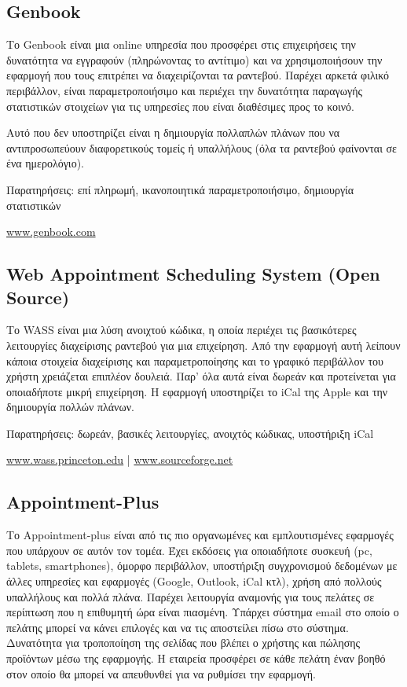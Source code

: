 \subsection{Genbook}
Το Genbook είναι μια online υπηρεσία που προσφέρει στις επιχειρήσεις την δυνατότητα να εγγραφούν (πληρώνοντας το αντίτιμο) και να χρησιμοποιήσουν την εφαρμογή που τους επιτρέπει να διαχειρίζονται τα ραντεβού. Παρέχει αρκετά φιλικό περιβάλλον, είναι παραμετροποιήσιμο και περιέχει την δυνατότητα παραγωγής στατιστικών στοιχείων για τις υπηρεσίες που είναι διαθέσιμες προς το κοινό. 

Αυτό που δεν υποστηρίζει είναι η δημιουργία πολλαπλών πλάνων που να αντιπροσωπεύουν διαφορετικούς τομείς ή υπαλλήλους (όλα τα ραντεβού φαίνονται σε ένα ημερολόγιο).

Παρατηρήσεις: επί πληρωμή, ικανοποιητικά παραμετροποιήσιμο, δημιουργία στατιστικών

\href{http://www.genbook.com}{www.genbook.com}

\subsection{Web Appointment Scheduling System (Open Source)}
Το WASS είναι μια λύση ανοιχτού κώδικα, η οποία περιέχει τις βασικότερες λειτουργίες διαχείρισης ραντεβού για μια επιχείρηση. Από την εφαρμογή αυτή λείπουν κάποια στοιχεία διαχείρισης και παραμετροποίησης και το γραφικό περιβάλλον του χρήστη χρειάζεται επιπλέον δουλειά. Παρ' όλα αυτά είναι δωρεάν και προτείνεται για οποιαδήποτε μικρή επιχείρηση. Η εφαρμογή υποστηρίζει το iCal της Apple και την δημιουργία πολλών πλάνων.

Παρατηρήσεις: δωρεάν, βασικές λειτουργίες, ανοιχτός κώδικας, υποστήριξη iCal

\href{https://wass.princeton.edu/pages/login.page.php}{www.wass.princeton.edu} |
\href{http://sourceforge.net/projects/wass/}{www.sourceforge.net}

\subsection{Appointment-Plus}
Το Appointment-plus είναι από τις πιο οργανωμένες και εμπλουτισμένες εφαρμογές που υπάρχουν σε αυτόν τον τομέα. Έχει εκδόσεις για οποιαδήποτε συσκευή (pc, tablets, smartphones), όμορφο περιβάλλον, υποστήριξη συγχρονισμού δεδομένων με άλλες υπηρεσίες και εφαρμογές (Google, Outlook, iCal κτλ), χρήση από πολλούς υπαλλήλους και πολλά πλάνα. Παρέχει λειτουργία αναμονής για τους πελάτες σε περίπτωση που η επιθυμητή ώρα είναι πιασμένη. Υπάρχει σύστημα email στο οποίο ο πελάτης μπορεί να κάνει επιλογές και να τις αποστείλει πίσω στο σύστημα. Δυνατότητα για τροποποίηση της σελίδας που βλέπει ο χρήστης και πώλησης προϊόντων μέσω της εφαρμογής. Η εταιρεία προσφέρει σε κάθε πελάτη έναν βοηθό στον οποίο θα μπορεί να απευθυνθεί για να ρυθμίσει την εφαρμογή. 

